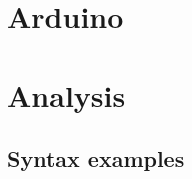 \part{Arduino}



\part{Analysis} \label{chap:analysis}

%
%




\chapter{Syntax examples}\label{analysis:syntax-examples}

